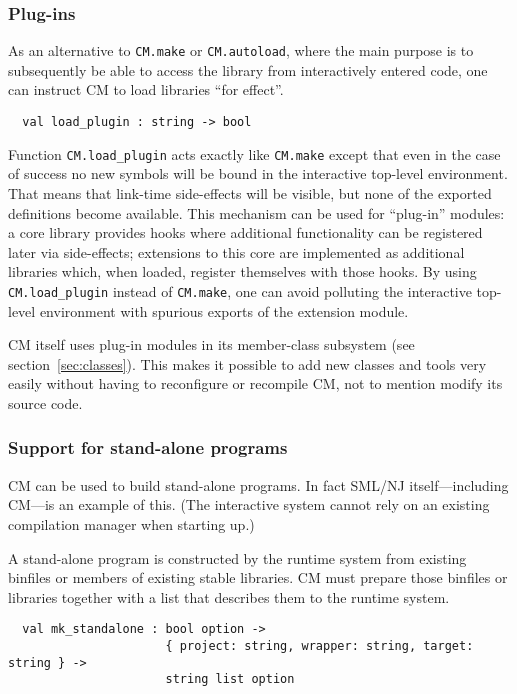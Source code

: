 \documentclass[titlepage,letterpaper]{article}
\begin{document}
\subsubsection{Plug-ins}

As an alternative to {\tt CM.make} or {\tt CM.autoload}, where the
main purpose is to subsequently be able to access the library from
interactively entered code, one can instruct CM to load libraries
``for effect''.

\begin{verbatim}
  val load_plugin : string -> bool
\end{verbatim}

Function {\tt CM.load\_plugin} acts exactly like {\tt CM.make} except
that even in the case of success no new symbols will be bound in the
interactive top-level environment.  That means that link-time
side-effects will be visible, but none of the exported definitions
become available.  This mechanism can be used for ``plug-in'' modules:
a core library provides hooks where additional functionality can be
registered later via side-effects; extensions to this core are
implemented as additional libraries which, when loaded, register
themselves with those hooks.  By using {\tt CM.load\_plugin} instead
of {\tt CM.make}, one can avoid polluting the interactive top-level
environment with spurious exports of the extension module.

CM itself uses plug-in modules in its member-class subsystem (see
section~\ref{sec:classes}).  This makes it possible to add new classes
and tools very easily without having to reconfigure or recompile CM,
not to mention modify its source code.

\subsubsection{Support for stand-alone programs}
\label{sec:mlbuild:support}

CM can be used to build stand-alone programs. In fact SML/NJ
itself---including CM---is an example of this.  (The interactive
system cannot rely on an existing compilation manager when starting
up.)

A stand-alone program is constructed by the runtime system from
existing binfiles or members of existing stable libraries.  CM must
prepare those binfiles or libraries together with a list that
describes them to the runtime system.

\begin{verbatim}
  val mk_standalone : bool option ->
                      { project: string, wrapper: string, target: string } ->
                      string list option
\end{verbatim}
\end{document}
